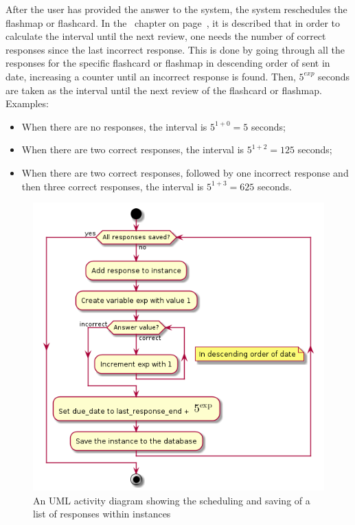 After the user has provided the answer to the system, the system reschedules the flashmap or flashcard. In the~ chapter on page~\pageref{subsec:adaptivesequencing}, it is described that in order to calculate the interval until the next review, one needs the number of correct responses since the last incorrect response. This is done by going through all the responses for the specific flashcard or flashmap in descending order of sent in date, increasing a counter until an incorrect response is found. Then, $5^{exp}$ seconds are taken as the interval until the next review of the flashcard or flashmap. Examples:
%
\begin{itemize}
    \item When there are no responses, the interval is $5^{1+0}=5$ seconds;
        \item When there are two correct responses, the interval is $5^{1+2}=125$ seconds;
        \item When there are two correct responses, followed by one incorrect response and then three correct responses, the interval is $5^{1+3}=625$ seconds.
\end{itemize}

\begin{figure}
\centering
    \includegraphics[height=.5\textheight]{img/learningserver.png}
\caption{An UML activity diagram showing the scheduling and saving of a list of responses within instances}
\label{fig:learningserver}
\end{figure}

